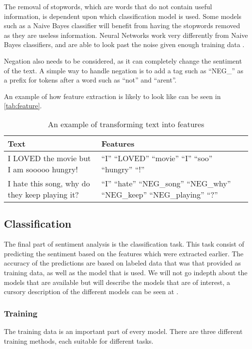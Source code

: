 The removal of stopwords, which are words that do not contain useful
information, is dependent upon which classification model is used. Some models
such as a Naive Bayes classifier will benefit from having the stopwords removed
as they are useless information. Neural Networks work very differently from
Naive Bayes classifiers, and are able to look past the noise given enough
training data \Source.\nl

Negation also needs to be considered, as it can completely change the sentiment
of the text. A simple way to handle negation is to add a tag such as ``NEG\_'' as
a prefix for tokens after a word such as ``not'' and ``arent''.\nl 

An example of how feature extraction is likely to look like can be seen in
\autoref{tab:feature}.

\begin{table}[H]
\centering
\begin{tabular}{|p{6cm}|p{8cm}|}
\hline
Text & Features \\ \hline
I LOVED the movie but I am sooooo hungry! & 
``I'' ``LOVED'' ``movie'' ``I'' ``soo'' ``hungry'' ``!''
\\ \hline 
I hate this song, why do they keep playing it? &
``I'' ``hate'' ``NEG\_song'' ``NEG\_why'' ``NEG\_keep'' ``NEG\_playing'' ``?''  
\\ \hline
\end{tabular}
\caption{An example of transforming text into features}
\label{tab:feature}
\end{table}


\subsection{Classification}

The final part of sentiment analysis is the classification task. This task
consist of predicting the sentiment based on the features which were extracted
earlier. The accuracy of the predictions are based on labeled data that was that
provided as training data, as well as the model that is used. We will not go
indepth about the models that are available but will describe the models that
are of interest, a cursory description of the different models can be seen at
\citep{Classification}.

\subsubsection{Training}
The training data is an important part of every model. There are three different
training methods, each suitable for different tasks. 

